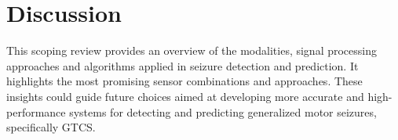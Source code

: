 \section{Discussion}

This scoping review provides an overview of the modalities, signal processing approaches and algorithms applied in seizure detection and prediction. It highlights the most promising sensor combinations and approaches. These insights could guide future choices aimed at developing more accurate and high-performance systems for detecting and predicting generalized motor seizures, specifically GTCS.









